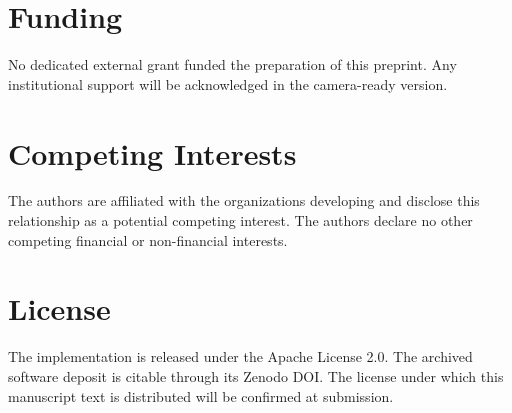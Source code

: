 \section*{Funding}\label{sec:funding}
No dedicated external grant funded the preparation of this preprint. Any
institutional support will be acknowledged in the camera-ready version.

\section*{Competing Interests}\label{sec:competing-interests}
The authors are affiliated with the organizations developing \Argorix and
disclose this relationship as a potential competing interest. The authors
declare no other competing financial or non-financial interests.

\section*{License}\label{sec:license}
The \Argorix implementation is released under the Apache License 2.0. The
archived software deposit is citable through its Zenodo DOI. The license under
which this manuscript text is distributed will be confirmed at submission.
